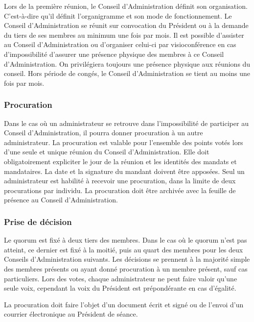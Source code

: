 \documentclass[12pt]{article}
\begin{document}
Lors de la première réunion, le Conseil d’Administration définit son organisation. C’est-à-dire qu’il définit
l’organigramme et son mode de fonctionnement.
Le Conseil d’Administration se réunit sur convocation du Président ou à la demande du tiers de ses membres
au minimum une fois par mois.
Il est possible d’assister au Conseil d’Administration ou d’organiser celui-ci par visioconférence en cas
d’impossibilité d’assurer une présence physique des membres à ce Conseil d’Administration. On privilégiera
toujours une présence physique aux réunions du conseil.
Hors période de congés, le Conseil d’Administration se tient au moins une fois par mois.

\subsubsection{Procuration}
\label{sec:entites_decisionnelles:conseil_admin:procuration}

Dans le cas où un administrateur se retrouve dans l’impossibilité de participer au Conseil d’Administration, il
pourra donner procuration à un autre administrateur.
La procuration est valable pour l’ensemble des points votés lors d’une seule et unique réunion du Conseil
d’Administration. Elle doit obligatoirement expliciter le jour de la réunion et les identités des mandats et
mandataires. La date et la signature du mandant doivent être apposées.
Seul un administrateur est habilité à recevoir une procuration, dans la limite de deux procurations par individu.
La procuration doit être archivée avec la feuille de présence au Conseil d’Administration.

\subsubsection{Prise de décision}
\label{sec:entites_decisionnelles:conseil_admin:decision}

Le quorum est fixé à deux tiers des membres. Dans le cas où le quorum n’est pas atteint, ce dernier est fixé à
la moitié, puis au quart des membres pour les deux Conseils d’Administration suivants.
Les décisions se prennent à la majorité simple des membres présents ou ayant donné procuration à un
membre présent, sauf cas particuliers.
Lors des votes, chaque administrateur ne peut faire valoir qu’une seule voix, cependant la voix du Président
est prépondérante en cas d’égalité.



La procuration doit faire l’objet d’un document écrit et signé ou de l’envoi d’un courrier électronique au
Président de séance.
\end{document}
